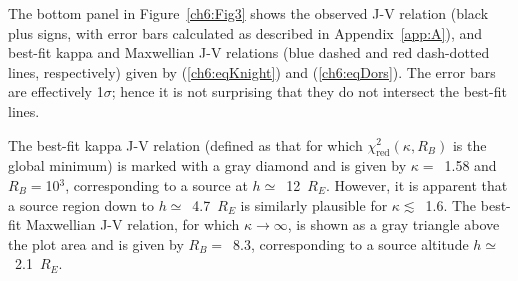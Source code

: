   The bottom panel in Figure~\ref{ch6:Fig3} shows the observed J-V relation
  (black plus signs, with error bars calculated as described in
  Appendix~\ref{app:A}), and best-fit kappa and Maxwellian J-V relations (blue
  dashed and red dash-dotted lines, respectively) given by (\ref{ch6:eqKnight})
  and (\ref{ch6:eqDors}). The error bars are effectively 1$\sigma$; hence it is
  not surprising that they do not intersect the best-fit lines. 

  The best-fit kappa J-V relation (defined as that for which
  $\chi^2_{\textrm{red}} ( \kappa, R_B )$ is the global minimum) is marked with
  a gray diamond and is given by $\kappa =$~1.58 and $R_B =$10$^3$,
  corresponding to a source at $h \simeq$~12~$R_E$. However, it is apparent that
  a source region down to $h \simeq$~4.7~$R_E$ is similarly plausible for
  $\kappa \lesssim$~1.6. The best-fit Maxwellian J-V relation, for which
  $\kappa \rightarrow \infty$, is shown as a gray triangle above the plot area
  and is given by $R_B =$~8.3, corresponding to a source altitude
  $h \simeq$~2.1~$R_E$.


